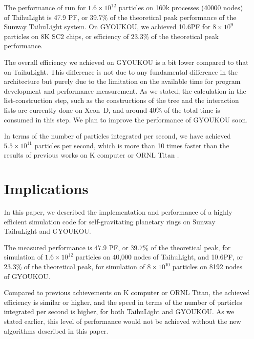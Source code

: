 \documentclass[conference]{IEEEtran}
\begin{document}
The performance of run for $1.6\times 10^{12}$ particles on 160k
processes (40000 nodes) of TaihuLight is 47.9 PF, or 39.7\% of the
theoretical peak performance of the Sunway TaihuLight system.  On
GYOUKOU, we achieved 10.6PF for $8\times 10^{9}$ particles on 8K SC2
chips, or efficiency of 23.3\% of the theoretical peak performance.

The overall efficiency we achieved on GYOUKOU is a bit lower compared
to that on TaihuLight. This difference is not due to any fundamental
difference in the architecture but purely due to the limitation on the
available time for program development and performance measurement. As
we stated, the calculation in the list-construction step, such as
the constructions of the tree and the interaction lists are currently
done on Xeon~D, and around 40\% of the total time is consumed in this
step. We plan to improve the performance of GYOUKOU soon.

 In terms of the number of
particles integrated per second, we have achieved $5.5\times
10^{11}$ particles per second, which is more than 10 times faster than
the results of previous works on
K computer\cite{Ishiyamaetal2012} or ORNL Titan
\cite{Bedorfetal2014}.


\section{Implications}


In this paper, we described the implementation and performance of
a highly efficient simulation code for self-gravitating planetary
rings on  Sunway TaihuLight and GYOUKOU.

The measured performance is 47.9 PF, or 39.7\% of the theoretical
peak, for simulation of $1.6\times 10^{12}$ particles on 40,000 nodes
of TaihuLight, and 10.6PF, or 23.3\% of the theoretical peak, for
simulation of $8\times 10^{10}$ particles on 8192 nodes of GYOUKOU.

Compared to previous achievements on K computer or ORNL Titan, the
achieved efficiency is similar or higher, and the speed in terms of
the number of particles integrated per second is higher, for both
TaihuLight and GYOUKOU. As we stated earlier, this level of
performance would not be achieved without the new algorithms described in
this paper. 
\end{document}
